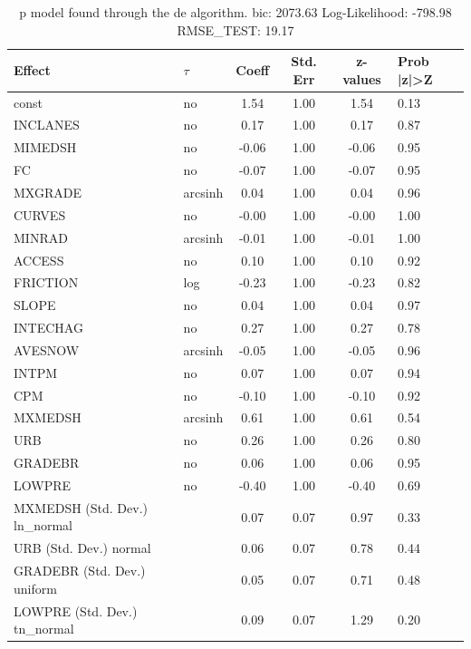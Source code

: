 \begin{table}
	\caption{p model found through the de algorithm. bic: 2073.63 Log-Likelihood: -798.98 RMSE_TEST: 19.17}
	\begin{center}
		\begin{tabular}{|l|l|c|c|c|l|}
			\hline
			Effect & $\tau$ & Coeff & Std. Err & z-values & Prob |z|>Z \\
			\hline
			const & no & 1.54 & 1.00 & 1.54 & 0.13 \\
			\hline
			INCLANES & no & 0.17 & 1.00 & 0.17 & 0.87 \\
			\hline
			MIMEDSH & no & -0.06 & 1.00 & -0.06 & 0.95 \\
			\hline
			FC & no & -0.07 & 1.00 & -0.07 & 0.95 \\
			\hline
			MXGRADE & arcsinh & 0.04 & 1.00 & 0.04 & 0.96 \\
			\hline
			CURVES & no & -0.00 & 1.00 & -0.00 & 1.00 \\
			\hline
			MINRAD & arcsinh & -0.01 & 1.00 & -0.01 & 1.00 \\
			\hline
			ACCESS & no & 0.10 & 1.00 & 0.10 & 0.92 \\
			\hline
			FRICTION & log & -0.23 & 1.00 & -0.23 & 0.82 \\
			\hline
			SLOPE & no & 0.04 & 1.00 & 0.04 & 0.97 \\
			\hline
			INTECHAG & no & 0.27 & 1.00 & 0.27 & 0.78 \\
			\hline
			AVESNOW & arcsinh & -0.05 & 1.00 & -0.05 & 0.96 \\
			\hline
			INTPM & no & 0.07 & 1.00 & 0.07 & 0.94 \\
			\hline
			CPM & no & -0.10 & 1.00 & -0.10 & 0.92 \\
			\hline
			MXMEDSH & arcsinh & 0.61 & 1.00 & 0.61 & 0.54 \\
			\hline
			URB & no & 0.26 & 1.00 & 0.26 & 0.80 \\
			\hline
			GRADEBR & no & 0.06 & 1.00 & 0.06 & 0.95 \\
			\hline
			LOWPRE & no & -0.40 & 1.00 & -0.40 & 0.69 \\
			\hline
			MXMEDSH (Std. Dev.) ln_normal &  & 0.07 & 0.07 & 0.97 & 0.33 \\
			\hline
			URB (Std. Dev.) normal &  & 0.06 & 0.07 & 0.78 & 0.44 \\
			\hline
			GRADEBR (Std. Dev.) uniform &  & 0.05 & 0.07 & 0.71 & 0.48 \\
			\hline
			LOWPRE (Std. Dev.) tn_normal &  & 0.09 & 0.07 & 1.29 & 0.20 \\
			\hline
		\end{tabular}
	\end{center}
\end{table}